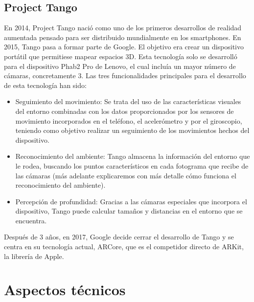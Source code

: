 \subsection{Project Tango}
En 2014, Project Tango nació como uno de los primeros desarrollos de realidad aumentada pensado para ser distribuido mundialmente en los smartphones. En 2015, Tango pasa a formar parte de Google. El objetivo era crear un dispositivo portátil que permitiese mapear espacios 3D. Esta tecnología solo se desarrolló para el dispositivo Phab2 Pro de Lenovo, el cual incluía un mayor número de cámaras, concretamente 3.
Las tres funcionalidades principales para el desarrollo de esta tecnología han sido:
\begin{itemize}
\item Seguimiento del movimiento: Se trata del uso de las características visuales del entorno combinadas con los datos proporcionados por los sensores de movimiento incorporados en el teléfono, el acelerómetro y por el giroscopio, teniendo como objetivo realizar un seguimiento de los movimientos hechos del dispositivo. 
\item Reconocimiento del ambiente: Tango almacena la información del entorno que le rodea, buscando los puntos característicos en cada fotograma que recibe de las cámaras (más adelante explicaremos con más detalle cómo funciona el reconocimiento del ambiente).
\item Percepción de profundidad: Gracias a las cámaras especiales que incorpora el dispositivo, Tango puede calcular tamaños y distancias en el entorno que se encuentra. 
\end{itemize}
Después de 3 años, en 2017, Google decide cerrar el desarrollo de Tango y se centra en su tecnología actual, ARCore, que es el competidor directo de ARKit, la librería de Apple.

\section{Aspectos técnicos}

